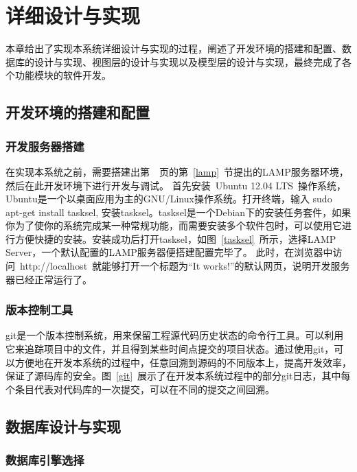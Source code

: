 
\chapter{详细设计与实现}

本章给出了实现本系统详细设计与实现的过程，阐述了开发环境的搭建和配置、数据库的设计与实现、视图层的设计与实现以及模型层的设计与实现，最终完成了各个功能模块的软件开发。

\section{开发环境的搭建和配置}

\subsection{开发服务器搭建}

在实现本系统之前，需要搭建出第~\pageref{lamp}~页的第~\ref{lamp}~节提出的LAMP服务器环境，然后在此开发环境下进行开发与调试。
首先安装~Ubuntu 12.04 LTS~操作系统，Ubuntu是一个以桌面应用为主的GNU/Linux操作系统。打开终端，输入
sudo apt-get install tasksel, 安装tasksel。tasksel是一个Debian下的安装任务套件，如果你为了使你的系统完成某一种常规功能，而需要安装多个软件包时，可以使用它进行方便快捷的安装。安装成功后打开tasksel，如图~\ref{tasksel}~所示，选择LAMP Server，一个默认配置的LAMP服务器便搭建配置完毕了。
此时，在浏览器中访问~http://localhost~就能够打开一个标题为“It works!”的默认网页，说明开发服务器已经正常运行了。 

\subsection{版本控制工具}
git是一个版本控制系统，用来保留工程源代码历史状态的命令行工具。可以利用它来追踪项目中的文件，并且得到某些时间点提交的项目状态。通过使用git，可以方便地在开发本系统的过程中，任意回溯到源码的不同版本上，提高开发效率，保证了源码库的安全。图~\ref{git}~展示了在开发本系统过程中的部分git日志，其中每个条目代表对代码库的一次提交，可以在不同的提交之间回溯。
\section{数据库设计与实现}
\subsection{数据库引擎选择}


